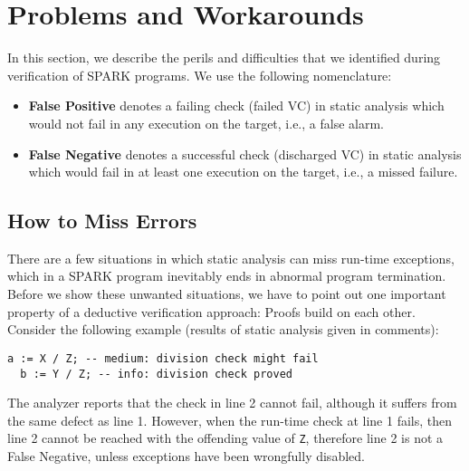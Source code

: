 \section{Problems and Workarounds}
\label{sec:workarounds}
In this section, we describe the perils and difficulties that we
identified during verification of SPARK programs. We use the following nomenclature:
\begin{itemize}
\item \textbf{False Positive} denotes a failing check (failed VC) in static analysis %
  which would not fail in any execution on the target, i.e., a false alarm.
\item \textbf{False Negative} denotes a successful check (discharged VC) in static
  analysis which %
  would fail in at least one execution on the target, i.e., a missed
  failure.
\end{itemize}

\subsection{How to Miss Errors}%
There are a few situations in which static analysis can miss run-time
exceptions, which in a SPARK program inevitably ends in abnormal
program termination. Before we show these unwanted situations, we have to
point out one important property of a deductive verification approach: Proofs
build on each other. Consider the following example (results of static
analysis given in comments):
\begin{lstlisting}[name=proofdep]
  a := X / Z; -- medium: division check might fail
  b := Y / Z; -- info: division check proved
\end{lstlisting}  
The analyzer reports that the check in line 2 cannot fail, although it
suffers from the same defect as line 1. However, when the run-time
check at line 1 fails, then line 2 cannot be reached with the
offending value of \lstinline$Z$, therefore line 2 is
not a False Negative, unless exceptions have been wrongfully disabled.

